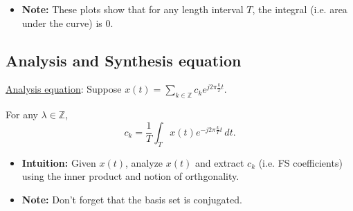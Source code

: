 \begin{derivation}
    \begin{center}
        \end{center}
    \begin{itemize}
        \item \textbf{Note:} These plots show that for any length interval $T$, the integral (i.e. area under the curve) is 0. 
    \end{itemize}
\end{derivation}

\subsection{Analysis and Synthesis equation}
\begin{definition}
    \underline{Analysis equation}: Suppose $x(t) = \sum_{k \in \mathbb{Z}} c_k e^{j 2\pi \frac{k}{T} t}$.

    For any $\lambda \in \mathbb{Z}$,
    \[
    c_k = \frac{1}{T} \int_T x(t) e^{-j 2\pi \frac{k}{T} t} \, dt.
    \]
    \begin{itemize}
        \item \textbf{Intuition:} Given $x(t)$, analyze $x(t)$ and extract $c_k$ (i.e. FS coefficients) using the inner product and notion of orthgonality.
        \item \textbf{Note:} Don't forget that the basis set is conjugated.
    \end{itemize}
\end{definition}

